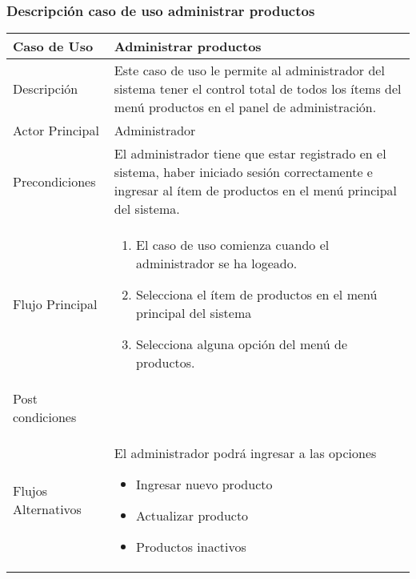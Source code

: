 \documentclass[12pt,a4paper]{article}
\begin{document}
    \newpage
\subsubsection*{Descripción caso de uso administrar productos}
\begin{table}[h]
        \centering
        \begin{tabular}{| p{3cm}| p{11cm} |} 
        \hline  
        Caso de Uso         &    \textbf{ Administrar productos}   \\ 
        \hline
        Descripción         &   Este caso de uso le permite al administrador del sistema tener el control total de todos los ítems del menú productos en el panel de administración.    \\ 
        \hline
        Actor Principal     &    Administrador  \\ 
        \hline
        Precondiciones      &  El administrador tiene que estar registrado en el sistema, haber iniciado sesión correctamente e ingresar al ítem de productos en el menú principal del sistema.   	\\
        \hline
        Flujo Principal     &    

            \begin{enumerate}
                \item El caso de uso comienza cuando el administrador se ha logeado.
                \item Selecciona el ítem de productos en el menú principal del sistema
                \item Selecciona alguna opción del menú de productos.
            \end{enumerate}
        \\  
        \hline
        Post condiciones    &       \\  
        \hline
        Flujos Alternativos &  El administrador podrá ingresar a las opciones
        \begin{itemize}
            \item Ingresar nuevo producto
            \item Actualizar producto
            \item Productos inactivos
        \end{itemize}
        \\  
        \hline
        \end{tabular}
    \end{table}

    \newpage
\end{document}

